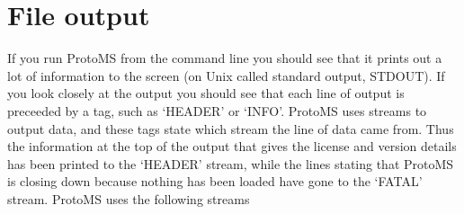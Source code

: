\documentclass[letterpaper,10pt,english]{sphinxmanual}
\begin{document}
\section{File output}
\label{protoms:file-output}
If you run ProtoMS from the command line you should see that it prints out a lot of information to the screen (on Unix called standard output, STDOUT). If you look closely at the output you should see that each line of output is preceeded by a tag, such as ‘HEADER’ or ‘INFO’. ProtoMS uses streams to output data, and these tags state which stream the line of data came from. Thus the information at the top of the output that gives the license and version details has been printed to the ‘HEADER’ stream, while the lines stating that ProtoMS is closing down because nothing has been loaded have gone to the ‘FATAL’ stream. ProtoMS uses the following streams
\end{document}
